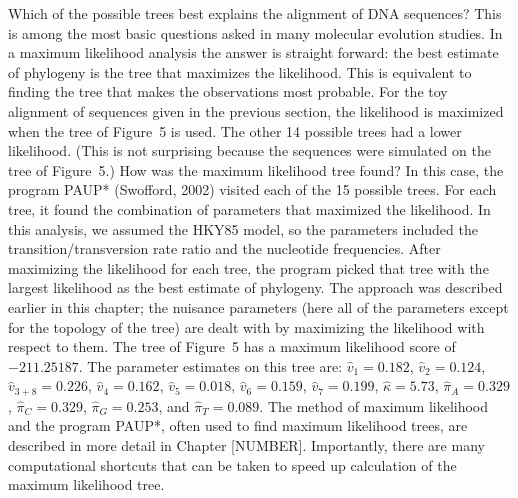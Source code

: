 \documentclass{svmult}
\begin{document}
Which of the possible trees best explains the alignment of DNA sequences? This is among the most
basic questions asked in many molecular evolution studies. In a maximum likelihood analysis the
answer is straight forward: the best estimate of phylogeny is the tree that maximizes the
likelihood. This is equivalent to finding the tree that makes the observations most probable. For
the toy alignment of sequences given in the previous section, the likelihood is maximized when the
tree of Figure~5 is used. The other 14 possible trees had a lower likelihood. (This is not
surprising because the sequences were simulated on the tree of Figure~5.) How was the maximum
likelihood tree found? In this case, the program PAUP* (Swofford, 2002) visited each of the 15
possible trees. For each tree, it found the combination of parameters that maximized the
likelihood. In this analysis, we assumed the HKY85 model, so the parameters included the
transition/transversion rate ratio and the nucleotide frequencies. After maximizing the likelihood
for each tree, the program picked that tree with the largest likelihood as the best estimate of
phylogeny. The approach was described earlier in this chapter; the nuisance parameters (here all of
the parameters except for the topology of the tree) are dealt with by maximizing the likelihood
with respect to them. The tree of Figure~5 has a maximum likelihood score of $-211.25187$. The
parameter estimates on this tree are:
$\hat{v}_1 = 0.182$,
$\hat{v}_2 = 0.124$,
$\hat{v}_{3 + 8} = 0.226$,
$\hat{v}_4 = 0.162$,
$\hat{v}_5 = 0.018$,
$\hat{v}_6 = 0.159$,
$\hat{v}_7 = 0.199$,
$\hat{\kappa} = 5.73$,
$\hat{\pi}_A = 0.329$,
$\hat{\pi}_C = 0.329$,
$\hat{\pi}_G = 0.253$, and
$\hat{\pi}_T = 0.089$.
The method of maximum likelihood and the program PAUP*, often used to find maximum likelihood
trees, are described in more detail in Chapter [NUMBER]. Importantly, there are many computational
shortcuts that can be taken to speed up calculation of the maximum likelihood tree.
\end{document}
